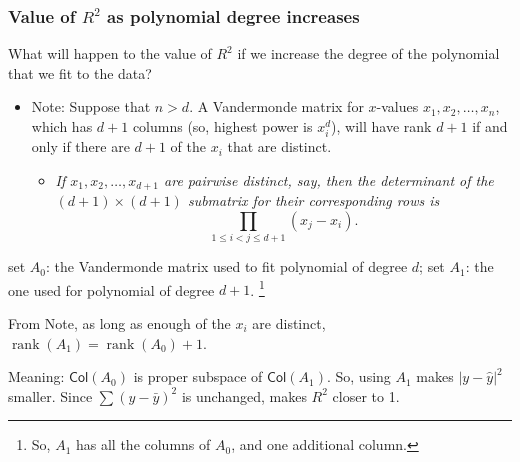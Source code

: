 \documentclass{beamer}
\theoremstyle{example}
\begin{document}
\begin{frame}
    \frametitle{Value of $R^2$ as polynomial degree increases}
    What will happen to the value of $R^2$ if we increase the degree of the polynomial that we fit to the data?

    \pause
    \begin{itemize}
        \item Note: Suppose that $n>d$. A Vandermonde matrix for $x$-values $x_1,x_2,\ldots, x_n$, which has $d+1$ columns (so, highest power is $x_i^d$), will have rank $d+1$ if and only if there are $d+1$ of the $x_i$ that are distinct.
        \pause
        \begin{itemize}
            \item[] \textit{If $x_1,x_2,\ldots,x_{d+1}$ are pairwise distinct, say, then the determinant of the $(d+1)\times(d+1)$ submatrix for their corresponding rows is}
            {\footnotesize
            \[{\displaystyle\prod_{1\le i<j\le d+1}(x_j - x_i)}.\]
            }
        \end{itemize}
    \end{itemize}

    \pause
    set $A_0$: the Vandermonde matrix used to fit polynomial of degree $d$; set $A_1$: the one used for polynomial of degree $d+1$. \footnote{So, $A_{1}$ has all the columns of $A_0$, and one additional column.} 
    
    From Note, as long as enough of the $x_i$ are distinct, $\operatorname{rank}(A_1) = \operatorname{rank}(A_0)+1$.

    \pause
    Meaning: $\textsf{Col}(A_0)$ is proper subspace of $\textsf{Col}(A_1)$. So, using $A_1$ makes $|y - \hat{y}|^2$ smaller. Since $\sum(y - \bar{y})^2$ is unchanged, makes $R^2$ closer to 1.
\end{frame}
\end{document}
